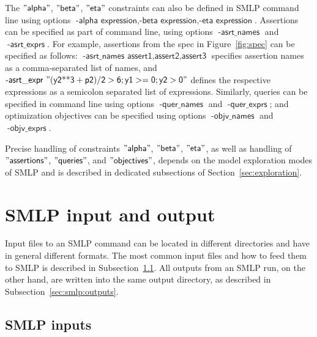 \documentclass[a4paper,parskip=half]{article} %
\newcommand*\option[1]{\operatorname{\mathsf{#1}}} %
\newcommand*\speckey[1]{\operatorname{\mathsf{"{#1}"}}} %
\begin{document}
The $\speckey{alpha}$, $\speckey{beta}$, $\speckey{eta}$ constraints can also be defined in SMLP 
command line using options $\option{-alpha\,\,expression, -beta\,\,expression, -eta\,\,expression}$.
Assertions can be specified as part of command line, using options $\option{-asrt\_names}$ and $\option{-asrt\_exprs}$.
For example, assertions from the spec in Figure~\ref{fig:spec}
can be specified as follows: $\option{-asrt\_names\,\,assert1,assert2,assert3}$ 
specifies assertion names as a comma-separated list of names, and 
$\option{-asrt\_expr\,\,"(y2**3+p2)/2>6;y1>=0;y2>0"}$
defines the respective expressions as a semicolon separated list of expressions.
Similarly, queries can be specified in command line using options 
$\option{-quer\_names}$ and $\option{-quer\_exprs}$; and optimization objectives can be
specified using options $\option{-objv\_names}$ and $\option{-objv\_exprs}$.

Precise handling of constraints $\speckey{alpha}$, $\speckey{beta}$, $\speckey{eta}$, as well as handling of
 $\speckey{assertions}$,  $\speckey{queries}$,  and $\speckey{objectives}$, depends on the model exploration 
modes of SMLP and is described in dedicated subsections of Section~\ref{sec:exploration}.



\section{SMLP input and output}\label{sec:smlp:inputs:outputs}

Input files to an SMLP command can be located in different directories and have in general different formats.
The most common input files and how to feed them to SMLP is described in Subsection~\ref{sec:smlp:inputs}. 
All outputs from an SMLP run, on the other hand, are written into the same output directory, as described in 
Subsection~\ref{sec:smlp:outputs}.

\subsection{SMLP inputs}\label{sec:smlp:inputs}
\end{document}
